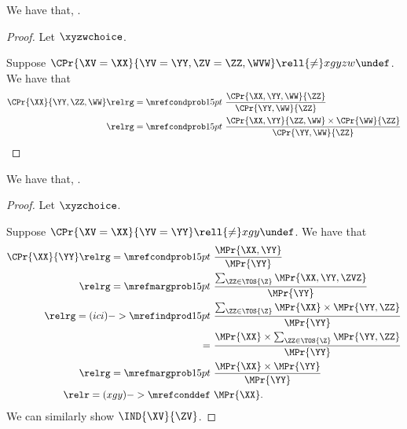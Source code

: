 \begin{proposition}
  We have that, \indwundefa.%
\end{proposition}

\begin{proof}
  Let $\xyzwchoice$.

  Suppose $\CPr{\XV = \XX}{\YV = \YY,\ZV = \ZZ,\WVW} \rell {\ne} xgyzw \undef$. We have that
  \begin{align*}
    \CPr{\XX}{\YY,\ZZ,\WW} \relrg = {\mrefcondprob} 15pt &\ \frac{\CPr{\XX,\YY,\WW}{\ZZ}}{\CPr{\YY,\WW}{\ZZ}}\\
    \relrg = {\mrefcondprob} 15pt &\ \frac{\CPr{\XX,\YY}{\ZZ,\WW}\times\CPr{\WW}{\ZZ}}{\CPr{\YY,\WW}{\ZZ}}\\
  \end{align*}
\end{proof}

\begin{proposition}
  We have that, \indwundefb.%
\end{proposition}

\begin{proof}
  Let $\xyzchoice$.

  Suppose $\CPr{\XV = \XX}{\YV = \YY} \rell {\ne} xgy \undef$. We have that
  \begin{align*}
    \CPr{\XX}{\YY} \relrg = {\mrefcondprob} 15pt &\ \frac{\MPr{\XX,\YY}}{\MPr{\YY}}\\
    \relrg = {\mrefmargprob} 15pt &\ \frac{\sum_{\ZZ \in \TOS{\Z}}\MPr{\XX,\YY,\ZVZ}}{\MPr{\YY}}\\
    \relrg = {(ici)->\mrefindprod} 15pt &\ \frac{\sum_{\ZZ \in \TOS{\Z}}\MPr{\XX}\times \MPr{\YY, \ZZ}}{\MPr{\YY}}\\
    = &\ \frac{\MPr{\XX}\times \sum_{\ZZ \in \TOS{\Z}}\MPr{\YY, \ZZ}}{\MPr{\YY}}\\
    \relrg = {\mrefmargprob} 15pt &\ \frac{\MPr{\XX}\times \MPr{\YY}}{\MPr{\YY}}\\
    \relr = {(xgy)->\mrefconddef} &\ \MPr{\XX}.
  \end{align*}
  We can similarly show $\IND{\XV}{\ZV}$.
\end{proof}
